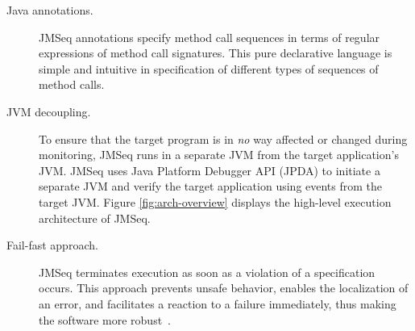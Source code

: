 \begin{description}
   \item[Java annotations.] 
JMSeq annotations specify  method call sequences  in terms of regular expressions of method call signatures.
 This pure declarative language is simple and intuitive in  specification  of  different types of sequences of method calls.
   \item[JVM decoupling.]
To ensure that the target program is in \emph{no} way affected or changed during monitoring, JMSeq runs in a separate JVM from the target application's JVM.
   JMSeq uses Java Platform Debugger API (JPDA) \cite{JPDA_Home} to initiate a separate JVM and verify the target application using events from the target JVM.
  Figure \ref{fig:arch-overview} displays the high-level execution architecture of JMSeq.
   \item[Fail-fast approach.] JMSeq terminates execution as soon as a violation of a specification occurs.  This approach prevents unsafe behavior,
   enables the localization of an error, and facilitates a reaction
   to a failure immediately, thus making the software more robust~\cite{Shore04a}.
\end{description}


